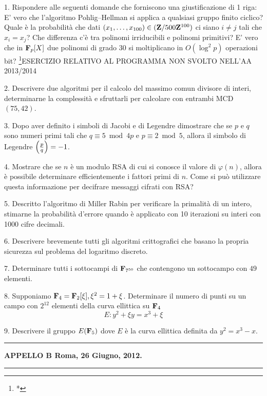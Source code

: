 \item{1.} Rispondere alle seguenti domande che forniscono una giustificazione di 1 riga:
 E' vero che l'algoritmo Pohlig--Hellman si applica a qualsiasi gruppo finito ciclico?
 Quale \`e la probabilit\`a che dati $(x_1,\ldots,x_{100})\in({\bf Z}/500{\bf Z}^{100})$ 
ci siano $i\neq j$ tali che $x_i= x_j$?
 Che differenza c'\`e tra polinomi irriducibili e polinomi primitivi?
 E' vero che in ${\bf F}_p[X]$ due polinomi di grado $30$ si moltiplicano in $O(\log^2p)$ operazioni bit? \footnote{*}{ESERCIZIO RELATIVO AL PROGRAMMA NON SVOLTO NELL'AA 2013/2014} 
\item{2.} Descrivere due algoritmi per il calcolo del massimo comun divisore di interi, determinarne la complessit\`a e sfruttarli
per calcolare con entrambi MCD$(75,42)$.
\item{3.} Dopo aver definito i simboli di Jacobi e di Legendre dimostrare che se $p$ e $q$ sono numeri primi tali che $q\equiv5\bmod 4p$ e 
$p\equiv2\bmod5$, allora il simbolo di Legendre $\left({p\over q}\right)=-1$.
\item{4.} Mostrare che se $n$ \`e un modulo RSA di cui si conosce il valore di $\varphi(n)$, allora \`e possibile
determinare efficientemente i fattori primi di $n$. Come si pu\`o utilizzare questa informazione
per decifrare messaggi cifrati con RSA?
\item{5.} Descritto l'algoritmo di Miller Rabin per verificare la primalit\`a di un intero, stimarne la probabilit\`a
d'errore quando \`e applicato con 10 iterazioni su interi con 1000 cifre decimali.
\item{6.} Descrivere brevemente tutti gli algoritmi crittografici che basano la propria sicurezza sul problema del logaritmo
discreto.
\item{7.} Determinare tutti i sottocampi di ${\bf F}_{7^{50}}$ che contengono un sottocampo con $49$ elementi.
\item{8.} Supponiamo ${\bf F}_4={\bf F}_2[\xi], \xi^2=1+\xi$. 
Determinare il numero di punti su un campo con $2^{12}$ elementi della curva ellittica su ${\bf F}_4$ 
$$E: y^2+\xi y=x^3+\xi$$
\item{9.} Descrivere il gruppo $E({\bf F}_5)$ dove $E$ \`e la curva ellittica definita da $y^2=x^3-x$.
\bigskip\vfill\eject

\smallskip\hrule\smallskip
\centerline{{\bf APPELLO B \hfill Roma, 26 Giugno, 2012.}} \smallskip\hrule\smallskip

